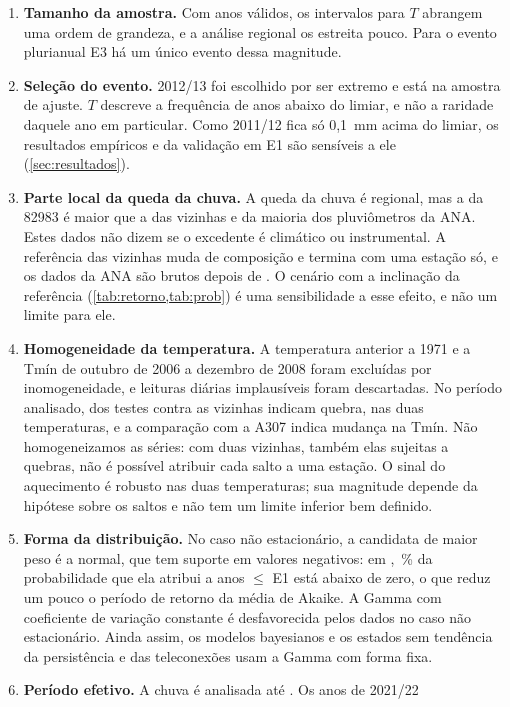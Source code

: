 \documentclass[11pt,a4paper]{article}
\newcommand{\Est}{82983}
\begin{document}
\begin{enumerate}
  \item \textbf{Tamanho da amostra.} Com \NanosValidos{} anos válidos, os intervalos para $T$
  abrangem uma ordem de grandeza, e a análise regional os estreita pouco. Para o evento plurianual E3
  há um único evento dessa magnitude.
  \item \textbf{Seleção do evento.} 2012/13 foi escolhido por ser extremo e está na amostra de
  ajuste. $T$ descreve a frequência de anos abaixo do limiar, e não a raridade daquele ano em
  particular. Como 2011/12 fica só 0,1~mm acima do limiar, os resultados empíricos e da validação em
  E1 são sensíveis a ele (\cref{sec:resultados}).
  \item \textbf{Parte local da queda da chuva.} A queda da chuva é regional, mas a da \Est{} é maior que
  a das vizinhas e da maioria dos pluviômetros da ANA. Estes dados não dizem se o excedente é climático
  ou instrumental. A referência das vizinhas muda de composição e termina com uma estação só, e os
  dados da ANA são brutos depois de \UltimoAnoConsAna{}. O cenário com a inclinação da referência
  (\cref{tab:retorno,tab:prob}) é uma sensibilidade a esse efeito, e não um limite para ele.
  \item \textbf{Homogeneidade da temperatura.} A temperatura anterior a 1971 e a Tmín de outubro de
  2006 a dezembro de 2008 foram excluídas por inomogeneidade, e leituras diárias implausíveis foram
  descartadas. No período analisado, \NquebrasTemp{} dos \NtestesTemp{} testes contra as vizinhas
  indicam quebra, nas duas temperaturas, e a comparação com a A307 indica mudança na Tmín. Não homogeneizamos
  as séries: com duas vizinhas, também elas sujeitas a quebras, não é possível atribuir cada salto a
  uma estação. O sinal do aquecimento é robusto nas duas temperaturas; sua magnitude depende da
  hipótese sobre os saltos e não tem um limite inferior bem definido.
  \item \textbf{Forma da distribuição.} No caso não estacionário, a candidata de maior peso é a
  normal, que tem suporte em valores negativos: em \UltimoAnoNS{}, \PctNormalNeg{}\,\% da probabilidade
  que ela atribui a anos $\le$ E1 está abaixo de zero, o que reduz um pouco o período de retorno da
  média de Akaike. A Gamma com coeficiente de variação constante é desfavorecida pelos dados no caso
  não estacionário. Ainda assim, os modelos bayesianos e os estados sem tendência da persistência e
  das teleconexões usam a Gamma com forma fixa.
  \item \textbf{Período efetivo.} A chuva é analisada até \UltimoAnoValido{}. Os anos de 2021/22

\end{enumerate}
\end{document}
